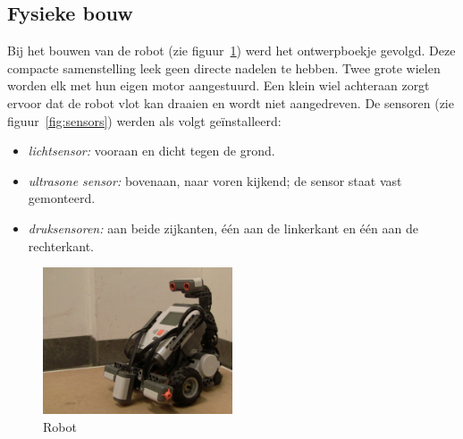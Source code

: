\documentclass[tt3]{penoverslag}
\begin{document}
\subsection{Fysieke bouw} %
\label{ssec:fysbouw}
Bij het bouwen van de robot (zie figuur~\ref{robot}) werd het ontwerpboekje gevolgd. Deze compacte samenstelling leek geen directe nadelen te hebben. Twee grote wielen worden elk met hun eigen motor aangestuurd. Een klein wiel achteraan zorgt ervoor dat de robot vlot kan draaien en wordt niet aangedreven. De sensoren (zie figuur~\ref{fig:sensors}) werden als volgt ge\"installeerd: 

\begin{itemize}
\item \textit{lichtsensor:} vooraan en dicht tegen de grond.
\item \textit{ultrasone sensor:} bovenaan, naar voren kijkend; de sensor staat vast gemonteerd.
\item \textit{druksensoren:} aan beide zijkanten, \'e\'en aan de linkerkant en \'e\'en aan de rechterkant.
\end{itemize}

\begin{figure}[tbp]
\begin{center}
    \includegraphics[width=0.5\textwidth]{robot}
    \caption{Robot}
    \label{robot}
\end{center}
\end{figure}
\end{document}
